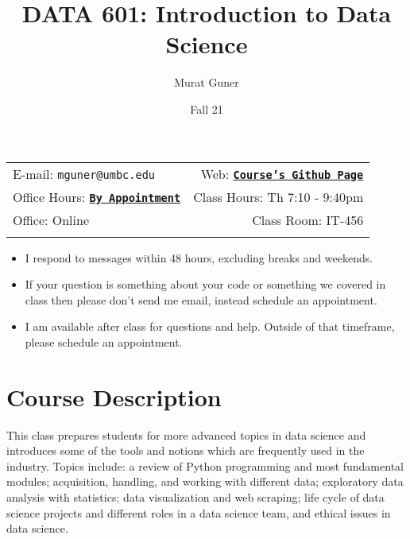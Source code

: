 \documentclass[11pt]{article}
\title{DATA 601: Introduction to Data Science}
\author{Murat Guner}
\date{Fall 21}
\newcommand{\blankline}{\quad\pagebreak[2]}
\begin{document}
\maketitle

\blankline

\begin{tabular*}{.93\textwidth}{@{\extracolsep{\fill}}lr}



E-mail: \texttt{mguner@umbc.edu} & Web: \href{https://github.com/mguner/601_Fall21_Thursday}{\tt\bf Course's Github Page}  \\

 Office Hours: \href{https://calendly.com/mguner/fall21-officehours}{\tt\bf By Appointment} &  Class Hours: Th 7:10 - 9:40pm \\

 Office: Online & Class Room: IT-456 \\
 & \\
\hline
\end{tabular*}


\vspace{5 mm}

\begin{itemize}
	\item I respond to messages within 48 hours, excluding breaks and weekends.
	\item If your question is something about your code or something we covered in class then please don't send me email, instead schedule an appointment.
	\item I am available after class for questions and help. Outside of that timeframe, please schedule an appointment.
\end{itemize}


\section*{Course Description}

This class prepares students for more advanced topics in data science and introduces some of the tools and notions which are frequently used in the industry. Topics include: a review of Python programming and most fundamental modules; acquisition, handling, and working with different data; exploratory data analysis with statistics; data visualization and web scraping; life cycle of data science projects and different roles in a data science team, and ethical issues in data science.
\end{document}
